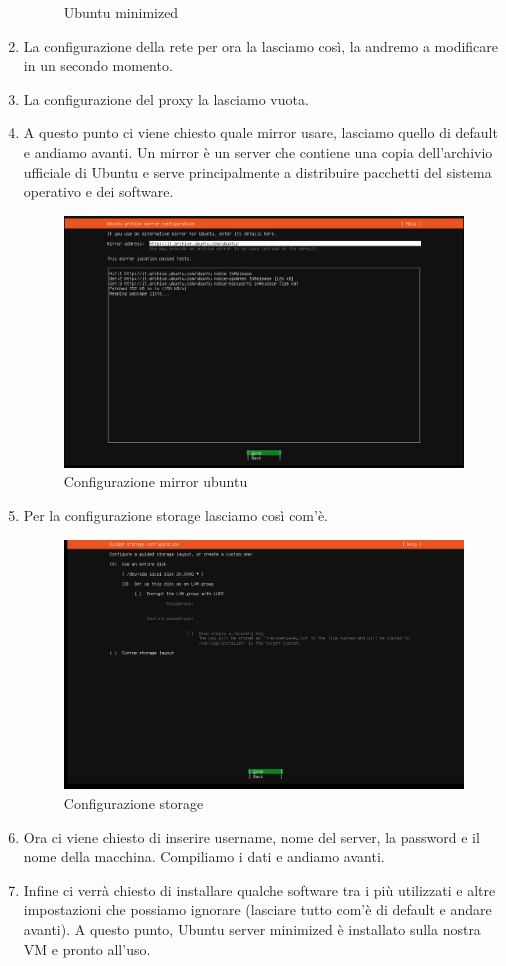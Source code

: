 \documentclass[12pt,a4paper,twoside]{book}
\begin{document}
\begin{enumerate}
\begin{figure}[H]
        \caption{Ubuntu minimized}
        \label{fig:installazione_minimized}
    \end{figure}
    \item La configurazione della rete per ora la lasciamo così, la andremo a modificare in un secondo momento.
    \item La configurazione del proxy la lasciamo vuota.
    \item A questo punto ci viene chiesto quale mirror usare, lasciamo quello di default e andiamo avanti. Un mirror è un server che contiene una copia dell'archivio ufficiale di Ubuntu e serve principalmente a distribuire pacchetti del sistema operativo e dei software.
    \begin{figure}[H]
        \centering
        \includegraphics[width=.7\linewidth]{tesi/img/mirror_configuration.png}
        \caption{Configurazione mirror ubuntu}
        \label{fig:mirror_configuration}
    \end{figure}
    \item Per la configurazione storage lasciamo così com'è.
    \begin{figure}[H]
        \centering
        \includegraphics[width=.7\linewidth]{tesi/img/configurazione_storage.png}
        \caption{Configurazione storage}
        \label{fig:configurazione_storage}
    \end{figure}
    \item Ora ci viene chiesto di inserire username, nome del server, la password e il nome della macchina. Compiliamo i dati e andiamo avanti.
    \item Infine ci verrà chiesto di installare qualche software tra i più utilizzati e altre impostazioni che possiamo ignorare (lasciare tutto com'è di default e andare avanti). A questo punto, Ubuntu server minimized è installato sulla nostra \ac{VM} e pronto all'uso.
\end{enumerate}
\end{document}
